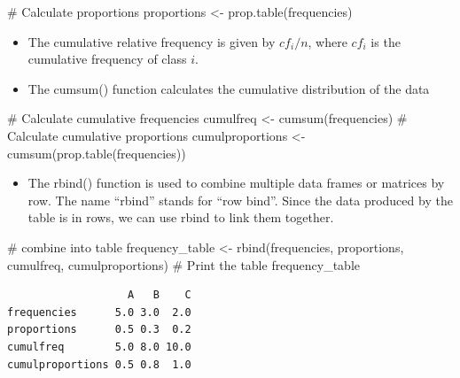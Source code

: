 \documentclass[
  letterpaper,
  DIV=11,
  numbers=noendperiod]{scrreprt}
\newenvironment{Shaded}{\begin{snugshade}}{\end{snugshade}}
\newcommand{\CommentTok}[1]{\textcolor[rgb]{0.37,0.37,0.37}{#1}}
\newcommand{\FunctionTok}[1]{\textcolor[rgb]{0.28,0.35,0.67}{#1}}
\newcommand{\NormalTok}[1]{\textcolor[rgb]{0.00,0.23,0.31}{#1}}
\newcommand{\OtherTok}[1]{\textcolor[rgb]{0.00,0.23,0.31}{#1}}
\providecommand{\tightlist}{%
  \setlength{\itemsep}{0pt}\setlength{\parskip}{0pt}}\usepackage{longtable,booktabs,array}
\begin{document}
\begin{Shaded}
\begin{Highlighting}[]
\CommentTok{\# Calculate proportions}
\NormalTok{proportions }\OtherTok{\textless{}{-}} \FunctionTok{prop.table}\NormalTok{(frequencies)}
\end{Highlighting}
\end{Shaded}

\begin{itemize}
\tightlist
\item
  The cumulative relative frequency is given by \(cf_i/n\), where
  \(cf_i\) is the cumulative frequency of class \(i\).
\item
  The cumsum() function calculates the cumulative distribution of the
  data
\end{itemize}

\begin{Shaded}
\begin{Highlighting}[]
\CommentTok{\# Calculate cumulative frequencies}
\NormalTok{cumulfreq }\OtherTok{\textless{}{-}} \FunctionTok{cumsum}\NormalTok{(frequencies)}
\CommentTok{\# Calculate cumulative proportions}
\NormalTok{cumulproportions }\OtherTok{\textless{}{-}} \FunctionTok{cumsum}\NormalTok{(}\FunctionTok{prop.table}\NormalTok{(frequencies))}
\end{Highlighting}
\end{Shaded}

\begin{itemize}
\tightlist
\item
  The rbind() function is used to combine multiple data frames or
  matrices by row. The name ``rbind'' stands for ``row bind''. Since the
  data produced by the table is in rows, we can use rbind to link them
  together.
\end{itemize}

\begin{Shaded}
\begin{Highlighting}[]
\CommentTok{\# combine into table}
\NormalTok{frequency\_table }\OtherTok{\textless{}{-}} \FunctionTok{rbind}\NormalTok{(frequencies, proportions, cumulfreq, cumulproportions)}
\CommentTok{\# Print the table}
\NormalTok{frequency\_table}
\end{Highlighting}
\end{Shaded}

\begin{verbatim}
                   A   B    C
frequencies      5.0 3.0  2.0
proportions      0.5 0.3  0.2
cumulfreq        5.0 8.0 10.0
cumulproportions 0.5 0.8  1.0
\end{verbatim}
\end{document}
